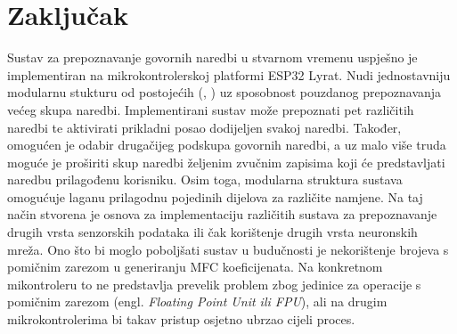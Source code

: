 \chapter{Zaključak}
\label{pog:zakljucak}

Sustav za prepoznavanje govornih naredbi u stvarnom vremenu uspješno je implementiran
na mikrokontrolerskoj platformi ESP32 Lyrat. Nudi jednostavniju modularnu
stukturu od postojećih (\cite{arm_kws}, \cite{tflmicrospeech}) uz sposobnost pouzdanog 
prepoznavanja većeg skupa
naredbi. Implementirani sustav može prepoznati pet
različitih naredbi te aktivirati prikladni posao dodijeljen svakoj naredbi. 
Također, omogućen je odabir 
drugačijeg podskupa govornih naredbi, a uz malo više truda moguće je proširiti skup naredbi
željenim zvučnim zapisima koji će predstavljati naredbu prilagođenu korisniku.
Osim toga, modularna struktura sustava
omogućuje laganu prilagodnu pojedinih dijelova za različite namjene. Na taj način stvorena je
osnova za implementaciju različitih sustava za prepoznavanje drugih vrsta senzorskih podataka
ili čak korištenje drugih vrsta neuronskih mreža. Ono što bi moglo poboljšati sustav
u budučnosti je
nekorištenje brojeva s pomičnim zarezom u generiranju MFC koeficijenata. Na konkretnom
mikontroleru to ne predstavlja prevelik problem zbog jedinice
za operacije s pomičnim zarezom (engl. \textit{Floating Point Unit ili FPU}),
ali na drugim mikrokontrolerima bi takav pristup osjetno ubrzao cijeli proces.


